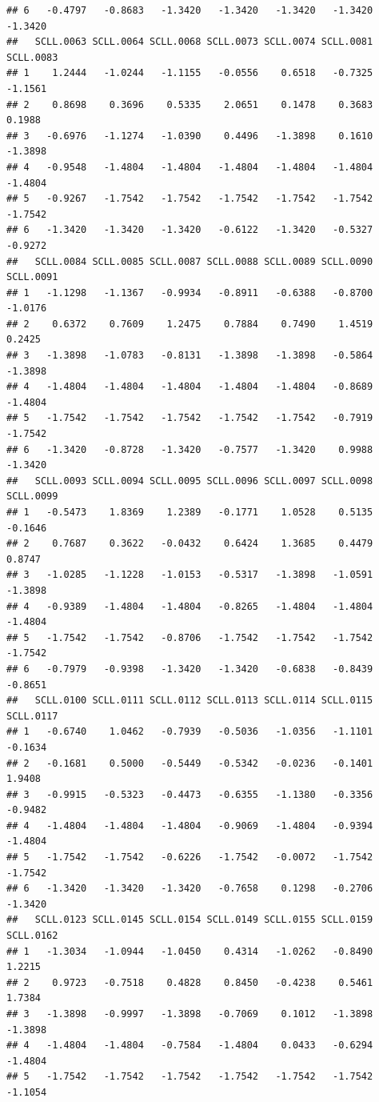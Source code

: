 \documentclass[
]{article}
\begin{document}
\begin{verbatim}
## 6   -0.4797   -0.8683   -1.3420   -1.3420   -1.3420   -1.3420   -1.3420
##   SCLL.0063 SCLL.0064 SCLL.0068 SCLL.0073 SCLL.0074 SCLL.0081 SCLL.0083
## 1    1.2444   -1.0244   -1.1155   -0.0556    0.6518   -0.7325   -1.1561
## 2    0.8698    0.3696    0.5335    2.0651    0.1478    0.3683    0.1988
## 3   -0.6976   -1.1274   -1.0390    0.4496   -1.3898    0.1610   -1.3898
## 4   -0.9548   -1.4804   -1.4804   -1.4804   -1.4804   -1.4804   -1.4804
## 5   -0.9267   -1.7542   -1.7542   -1.7542   -1.7542   -1.7542   -1.7542
## 6   -1.3420   -1.3420   -1.3420   -0.6122   -1.3420   -0.5327   -0.9272
##   SCLL.0084 SCLL.0085 SCLL.0087 SCLL.0088 SCLL.0089 SCLL.0090 SCLL.0091
## 1   -1.1298   -1.1367   -0.9934   -0.8911   -0.6388   -0.8700   -1.0176
## 2    0.6372    0.7609    1.2475    0.7884    0.7490    1.4519    0.2425
## 3   -1.3898   -1.0783   -0.8131   -1.3898   -1.3898   -0.5864   -1.3898
## 4   -1.4804   -1.4804   -1.4804   -1.4804   -1.4804   -0.8689   -1.4804
## 5   -1.7542   -1.7542   -1.7542   -1.7542   -1.7542   -0.7919   -1.7542
## 6   -1.3420   -0.8728   -1.3420   -0.7577   -1.3420    0.9988   -1.3420
##   SCLL.0093 SCLL.0094 SCLL.0095 SCLL.0096 SCLL.0097 SCLL.0098 SCLL.0099
## 1   -0.5473    1.8369    1.2389   -0.1771    1.0528    0.5135   -0.1646
## 2    0.7687    0.3622   -0.0432    0.6424    1.3685    0.4479    0.8747
## 3   -1.0285   -1.1228   -1.0153   -0.5317   -1.3898   -1.0591   -1.3898
## 4   -0.9389   -1.4804   -1.4804   -0.8265   -1.4804   -1.4804   -1.4804
## 5   -1.7542   -1.7542   -0.8706   -1.7542   -1.7542   -1.7542   -1.7542
## 6   -0.7979   -0.9398   -1.3420   -1.3420   -0.6838   -0.8439   -0.8651
##   SCLL.0100 SCLL.0111 SCLL.0112 SCLL.0113 SCLL.0114 SCLL.0115 SCLL.0117
## 1   -0.6740    1.0462   -0.7939   -0.5036   -1.0356   -1.1101   -0.1634
## 2   -0.1681    0.5000   -0.5449   -0.5342   -0.0236   -0.1401    1.9408
## 3   -0.9915   -0.5323   -0.4473   -0.6355   -1.1380   -0.3356   -0.9482
## 4   -1.4804   -1.4804   -1.4804   -0.9069   -1.4804   -0.9394   -1.4804
## 5   -1.7542   -1.7542   -0.6226   -1.7542   -0.0072   -1.7542   -1.7542
## 6   -1.3420   -1.3420   -1.3420   -0.7658    0.1298   -0.2706   -1.3420
##   SCLL.0123 SCLL.0145 SCLL.0154 SCLL.0149 SCLL.0155 SCLL.0159 SCLL.0162
## 1   -1.3034   -1.0944   -1.0450    0.4314   -1.0262   -0.8490    1.2215
## 2    0.9723   -0.7518    0.4828    0.8450   -0.4238    0.5461    1.7384
## 3   -1.3898   -0.9997   -1.3898   -0.7069    0.1012   -1.3898   -1.3898
## 4   -1.4804   -1.4804   -0.7584   -1.4804    0.0433   -0.6294   -1.4804
## 5   -1.7542   -1.7542   -1.7542   -1.7542   -1.7542   -1.7542   -1.1054

\end{verbatim}
\end{document}
